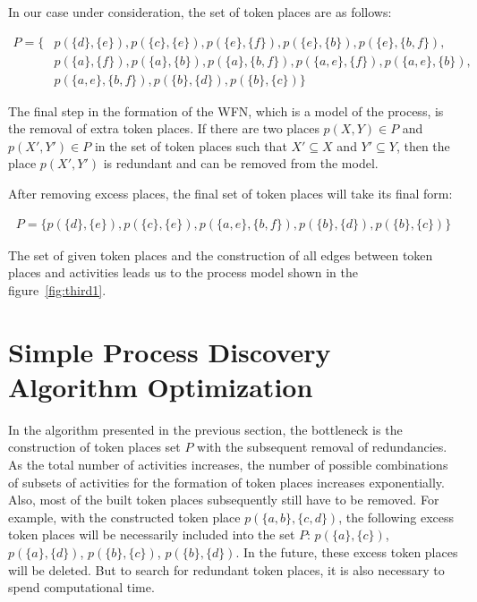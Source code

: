 \documentclass[
11pt,%
tightenlines,%
twoside,%
onecolumn,%
nofloats,%
nobibnotes,%
nofootinbib,%
superscriptaddress,%
noshowpacs,%
centertags]%
{revtex4}
\begin{document}
In our case under consideration, the set of token places are as follows:

\begin{equation}\label{eqn:p1}
\begin{aligned}
P = \{
& p(\{d\}, \{e\}),
p(\{c\}, \{e\}),
p(\{e\}, \{f\}),
p(\{e\}, \{b\}),
p(\{e\}, \{b, f\}), \\
& p(\{a\}, \{f\}),
p(\{a\}, \{b\}),
p(\{a\}, \{b, f\}),
p(\{a, e\}, \{f\}),
p(\{a, e\}, \{b\}), \\
& p(\{a, e\}, \{b, f\}),
p(\{b\}, \{d\}),
p(\{b\}, \{c\})
\}
\end{aligned}
\end{equation}

The final step in the formation of the WFN, which is a model of the process, is the removal of extra token places.
If there are two places $p(X, Y) \in P$ and $p(X ', Y') \in P$ in the set of token places such that $X' \subseteq X$ and $Y' \subseteq Y$, then the place $p(X', Y')$ is redundant and can be removed from the model.

After removing excess places, the final set of token places will take its final form:

\begin{equation}\label{eqn:p2}
\begin{aligned}
P = \{
p(\{d\}, \{e\}), p(\{c\}, \{e\}), p(\{a, e\}, \{b, f\}), p(\{b\}, \{d\}), p(\{b\}, \{c\})
\}
\end{aligned}
\end{equation}

The set of given token places and the construction of all edges between token places and activities leads us to the process model shown in the figure~\ref{fig:third1}.

\section{Simple Process Discovery Algorithm Optimization}

In the algorithm presented in the previous section, the bottleneck is the construction of token places set $P$ with the subsequent removal of redundancies.
As the total number of activities increases, the number of possible combinations of subsets of activities for the formation of token places increases exponentially.
Also, most of the built token places subsequently still have to be removed.
For example, with the constructed token place $p(\{a, b\}, \{c, d\})$, the following excess token places will be necessarily included into the set $P$: $p(\{a\}, \{c\})$, $p(\{a\}, \{d\})$, $p(\{b\}, \{c\})$, $p(\{b\}, \{d\})$.
In the future, these excess token places will be deleted.
But to search for redundant token places, it is also necessary to spend computational time.
\end{document}
